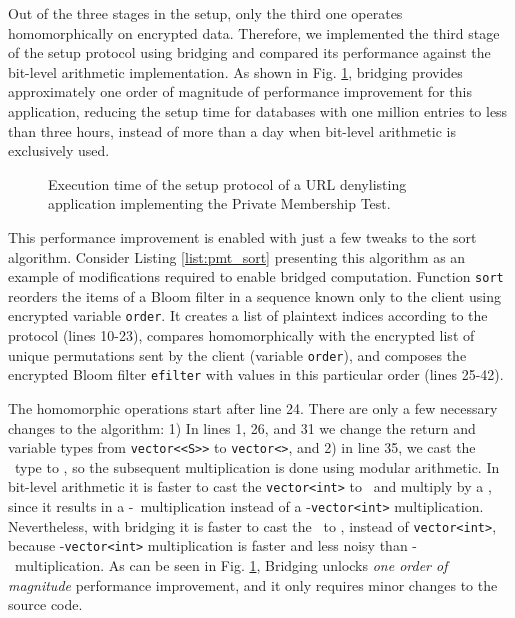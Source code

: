 Out of the three stages in the setup, only the third one operates homomorphically on encrypted data. Therefore, we implemented the third stage of the setup protocol using bridging and compared its performance against the bit-level arithmetic implementation.
As shown in Fig. \ref{fig:application}, bridging provides approximately one order of magnitude of performance improvement for this application, reducing the setup time for databases with one million entries to less than three hours, instead of more than a day when bit-level arithmetic is exclusively used.

\begin{figure}[t]
	\centering
	\caption{Execution time of the setup protocol of a URL denylisting application \cite{urldenylist} implementing the Private Membership Test.}
	\label{fig:application}
\end{figure}

This performance improvement is enabled with just a few tweaks to the sort algorithm.
Consider Listing \ref{list:pmt_sort} presenting this algorithm as an example of modifications required to enable bridged computation.
Function \texttt{sort} reorders the items of a Bloom filter in a sequence known only to the client using encrypted variable \texttt{order}. It creates a list of plaintext indices according to the protocol (lines 10-23), compares homomorphically with the encrypted list of unique permutations sent by the client (variable \texttt{order}), and composes the encrypted Bloom filter \texttt{efilter} with values in this particular order (lines 25-42).

The homomorphic operations start after line 24. There are only a few necessary changes to the algorithm: 1) In lines 1, 26, and 31 we change the return and variable types from \texttt{vector<\secuint<S>{}>} to \texttt{vector<\secmod>}, and 2) in line 35, we cast the \secbool\ type to \secmod, so the subsequent multiplication is done using modular arithmetic.
In bit-level arithmetic it is faster to cast the \texttt{vector<int>} to \secuint\ and multiply by a \secbool, since it results in a \secbool-\secuint\ multiplication instead of a \secuint-\texttt{vector<int>} multiplication. Nevertheless, with bridging it is faster to cast the \secbool\ to \secmod, instead of \texttt{vector<int>}, because \secmod-\texttt{vector<int>} multiplication is faster and less noisy than \secmod-\secmod\ multiplication.
As can be seen in Fig. \ref{fig:application}, Bridging unlocks {\it one order of magnitude} performance improvement, and it only requires minor changes to the source code.
